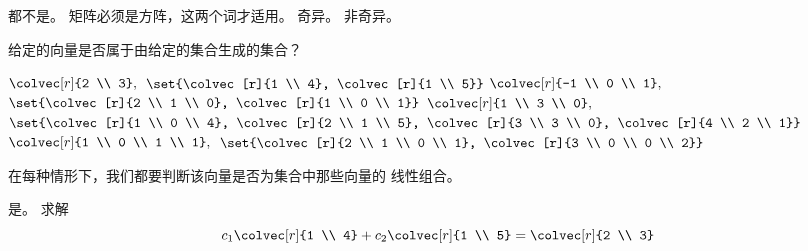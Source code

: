 \begin{exercises}
\begin{answer}
\begin{exparts}
      \partsitem 都不是。
        矩阵必须是方阵，这两个词才适用。
      \partsitem 奇异。
      \partsitem 非奇异。
     \end{exparts}
    \end{answer}
  \recommended \item
    给定的向量是否属于由给定的集合生成的集合？
      \begin{exparts}
        \partsitem \( \colvec[r]{2 \\ 3}, \)\
          \( \set{\colvec[r]{1 \\ 4},
                \colvec[r]{1 \\ 5}} \)
        \partsitem \( \colvec[r]{-1 \\ 0 \\ 1}, \)\
          \( \set{\colvec[r]{2 \\ 1 \\ 0},
                \colvec[r]{1 \\ 0 \\ 1}} \)
        \partsitem \( \colvec[r]{1 \\ 3 \\ 0}, \)\
          \( \set{\colvec[r]{1 \\ 0 \\ 4},
                \colvec[r]{2 \\ 1 \\ 5},
                \colvec[r]{3 \\ 3 \\ 0},
                \colvec[r]{4 \\ 2 \\ 1}} \)
        \partsitem \( \colvec[r]{1 \\ 0 \\ 1 \\ 1}, \)\
          \( \set{\colvec[r]{2 \\ 1 \\ 0 \\ 1},
                \colvec[r]{3 \\ 0 \\ 0 \\ 2}} \)
      \end{exparts}
      \begin{answer}
        在每种情形下，我们都要判断该向量是否为集合中那些向量的
        线性组合。
        \begin{exparts}
          \partsitem 是。
            求解
            \begin{equation*}
              c_1\colvec[r]{1 \\ 4}+c_2\colvec[r]{1 \\ 5}=\colvec[r]{2 \\ 3}

\end{equation*}
\end{exparts}
\end{answer}
\end{exercises}
